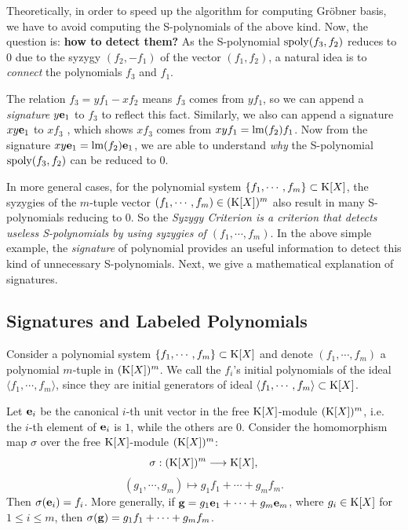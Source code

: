 \documentclass[preprint,authoryear,3p,12pt]{elsarticle}
\def\K{{\rm K}}
\def\lm{{\rm lm}}
\def\eb{{\bf e}}
\def\gb{{\bf g}}
\def\sp{{\rm spoly}}
\def\gr{{Gr\"obner }}
\begin{document}
Theoretically, in order to speed up the algorithm for computing \gr basis, we have to avoid computing the S-polynomials of the
above kind. Now, the  question is: {\bf how to detect them?} As the S-polynomial $\sp(f_3, f_2)$ reduces to $0$ due to the syzygy
$(f_2, -f_1)$ of the vector $(f_1, f_2)$, a natural idea is to {\em connect} the polynomials $f_3$ and $f_1$.

The relation $f_3=yf_1-xf_2$ means $f_3$ comes from $yf_1$, so we can append     a {\em signature} $y\eb_1$ to $f_3$ to reflect
this fact. Similarly, we also can append a signature $xy\eb_1$ to  $xf_3$ , which shows   $xf_3$ comes from $xyf_1=\lm(f_2)f_1$.
Now from the signature $xy\eb_1=\lm(f_2)\eb_1$, we are able to understand {\em why} the S-polynomial $\sp(f_3, f_2)$ can be
reduced to $0$.


In more general cases, for  the polynomial system $\{f_1, \cdots, f_m\}\subset \K[X]$, the syzygies of the $m$-tuple vector
$(f_1, \cdots, f_m)\in (\K[X])^m$ also result in many S-polynomials reducing to $0$. So the {\em Syzygy Criterion is a criterion
that detects useless S-polynomials by using syzygies of $(f_1, \cdots, f_m)$}. In the above simple example, the {\em signature}
of polynomial provides an useful information to detect this kind of unnecessary S-polynomials. Next, we give a mathematical
explanation of signatures.


\subsection{Signatures and Labeled Polynomials} \label{subsec-signature}

Consider a polynomial system $\{f_1, \cdots, f_m\}\subset \K[X]$ and denote $(f_1, \cdots, f_m)$ a polynomial $m$-tuple in
$(\K[X])^m$. We call the $f_i$'s initial polynomials of the ideal $\langle f_1, \cdots, f_m\rangle$, since they are initial generators of ideal $\langle f_1, \cdots, f_m
\rangle\subset \K[X]$.

Let $\eb_i$ be the canonical $i$-th unit vector
in the free $\K[X]$-module $(\K[X])^m$, i.e. the $i$-th element of $\eb_i$ is $1$, while the others are $0$. Consider the homomorphism
map $\sigma$ over the free $\K[X]$-module $(\K[X])^m$:
$$\sigma: (\K[X])^m \longrightarrow \K[X],$$
$$(g_1, \cdots, g_m) \longmapsto g_1f_1+\cdots+g_mf_m.$$ Then $\sigma(\eb_i)=f_i$. More
generally, if $\gb=g_1\eb_1+\cdots+ g_m\eb_m$, where $g_i\in \K[X]$
for $1\le i\le m$, then $\sigma(\gb)=g_1f_1+\cdots+g_mf_m$.
\end{document}
